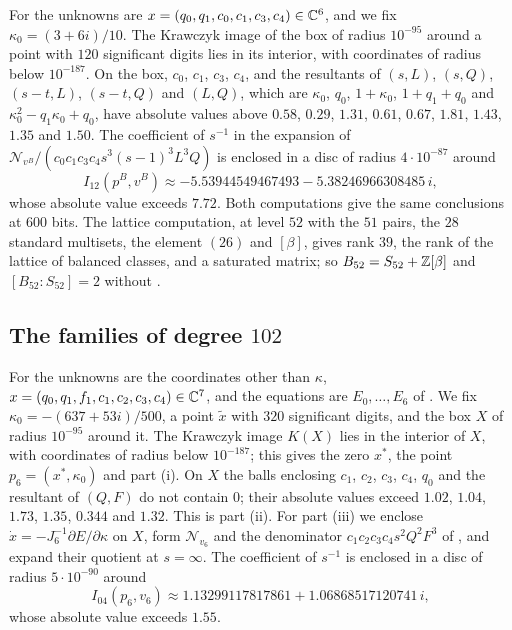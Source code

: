 For  the unknowns are $x=(q_{0},q_{1},c_{0},c_{1},c_{3},
c_{4})\in\mathbb{C}^{6}$, and we fix $\kappa_{0}=(3+6i)/10$. The Krawczyk image of
the box of radius $10^{-95}$ around a point with $120$ significant digits
lies in its interior, with coordinates of radius below $10^{-187}$. On the
box, $c_{0}$, $c_{1}$, $c_{3}$, $c_{4}$, and the resultants of $(s,L)$,
$(s,Q)$, $(s-t,L)$, $(s-t,Q)$ and $(L,Q)$, which are $\kappa_{0}$, $q_{0}$,
$1+\kappa_{0}$, $1+q_{1}+q_{0}$ and $\kappa_{0}^{2}-q_{1}\kappa_{0}+q_{0}$,
have absolute values above $0.58$, $0.29$, $1.31$, $0.61$, $0.67$, $1.81$,
$1.43$, $1.35$ and $1.50$. The coefficient of $s^{-1}$ in the expansion of
$\mathcal N_{v^{B}}/(c_{0}c_{1}c_{3}c_{4}s^{3}(s-1)^{3}L^{3}Q)$ is enclosed in
a disc of radius $4\cdot10^{-87}$ around
\[
  I_{12}(p^{B},v^{B})\approx-5.53944549467493-5.38246966308485\,i,
\]
whose absolute value exceeds $7.72$. Both computations give the same
conclusions at $600$ bits. The lattice computation, at level $52$ with the
$51$ pairs, the $28$ standard multisets, the element $(26)$ and $[\beta]$,
gives rank $39$, the rank of the lattice of balanced classes, and a saturated
matrix; so $B_{52}=S_{52}+\mathbb{Z}[\beta]$ and $[B_{52}:S_{52}]=2$ without
.

\subsection*{The families of degree \texorpdfstring{$102$}{102}}
For  the unknowns are the coordinates other than
$\kappa$, $x=(q_{0},q_{1},f_{1},c_{1},c_{2},c_{3},c_{4})\in\mathbb{C}^{7}$, and the
equations are $E_{0},\dots,E_{6}$ of . We fix $\kappa_{0}=-(637+53i)/500$, a point $\tilde x$
with $320$ significant digits, and the box $X$ of radius $10^{-95}$ around
it. The Krawczyk image $K(X)$ lies in the interior of $X$, with coordinates
of radius below $10^{-187}$; this gives the zero $x^{*}$, the point
$p_{6}=(x^{*},\kappa_{0})$ and part (i). On $X$ the balls enclosing $c_{1}$,
$c_{2}$, $c_{3}$, $c_{4}$, $q_{0}$ and the resultant of $(Q,F)$ do not
contain $0$; their absolute values exceed $1.02$, $1.04$, $1.73$, $1.35$,
$0.344$ and $1.32$. This is part (ii). For part (iii) we enclose $\dot x=
-J_{6}^{-1}\partial E/\partial\kappa$ on $X$, form $\mathcal N_{v_{6}}$ and
the denominator $c_{1}c_{2}c_{3}c_{4}s^{2}Q^{2}F^{3}$ of
, and expand their quotient at $s=\infty$. The
coefficient of $s^{-1}$ is enclosed in a disc of radius $5\cdot10^{-90}$
around
\[
  I_{04}(p_{6},v_{6})\approx1.13299117817861+1.06868517120741\,i,
\]
whose absolute value exceeds $1.55$.

